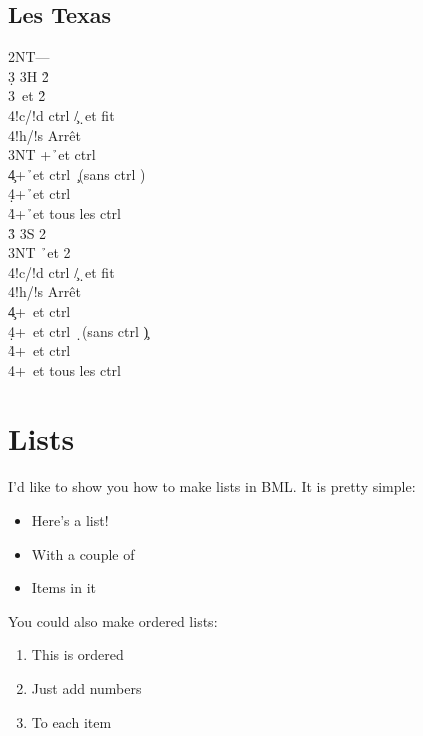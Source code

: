 \documentclass[a4paper]{article}
\begin{document}
\subsection{Les Texas}

\begin{bidtable}
2NT---\\
3\d \> 3H 2\h \+\\
3\s {}\s\ et 2\h \+\\
4!c/!d \> ctrl \c /\d\ et fit \s \\
4!h/!s \> Arrêt\-\\
3NT +\h\ et ctrl \s \\
4\c {}+\h\ et ctrl \c\ (sans ctrl \s )\\
4\d {}+\h\ et ctrl \d \\
4\h {}+\h\ et tous les ctrl\-\\
3\h \> 3S 2\s \+\\
3NT \h\ et 2\s \+\\
4!c/!d \> ctrl \c /\d\ et fit \h \\
4!h/!s \> Arrêt\-\\
4\c {}+\s\ et ctrl \c \\
4\d {}+\s\ et ctrl \d\ (sans ctrl \c )\\
4\h {}+\s\ et ctrl \h \\
4\s {}+\s\ et tous les ctrl\-
\end{bidtable}

\section{Lists}

I'd like to show you how to make lists in BML. It is pretty
simple:

\begin{itemize}
\item Here's a list!

\item With a couple of

\item Items in it

\end{itemize}

You could also make ordered lists:

\begin{enumerate}
\item This is ordered

\item Just add numbers

\item To each item

\end{enumerate}
\end{document}
